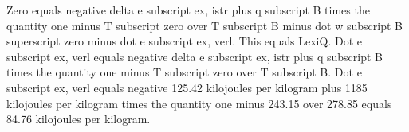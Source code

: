 Zero equals negative delta e subscript ex, istr plus q subscript B times the quantity one minus T subscript zero over T subscript B minus dot w subscript B superscript zero minus dot e subscript ex, verl. This equals LexiQ. Dot e subscript ex, verl equals negative delta e subscript ex, istr plus q subscript B times the quantity one minus T subscript zero over T subscript B. Dot e subscript ex, verl equals negative 125.42 kilojoules per kilogram plus 1185 kilojoules per kilogram times the quantity one minus 243.15 over 278.85 equals 84.76 kilojoules per kilogram.